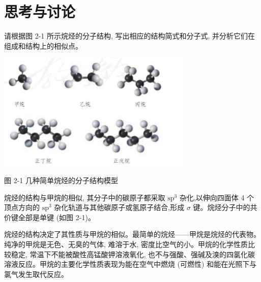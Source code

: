 \documentclass[10pt]{article}
\begin{document}
\section*{思考与讨论}

请根据图 2-1 所示烷烃的分子结构, 写出相应的结构简式和分子式, 并分析它们在组成和结构上的相似点。

\begin{center}
\end{center}

\begin{center}
\includegraphics[max width=0.7\textwidth]{images/0190efc5-b58a-7c43-bfb0-e0a030df9cfd_33_142214.jpg}
\end{center}

图 2-1 几种简单烷烃的分子结构模型

烷烃的结构与甲烷的相似, 其分子中的碳原子都采取 \({\mathrm{{sp}}}^{3}\) 杂化,以伸向四面体 4 个顶点方向的 \({\mathrm{{sp}}}^{3}\) 杂化轨道与其他碳原子或氢原子结合,形成 \(\sigma\) 键。烷烃分子中的共价键全部是单键 (如图 2-1)。

烷烃的结构决定了其性质与甲烷的相似。最简单的烷烃——甲烷是烷烃的代表物。纯净的甲烷是无色、无臭的气体, 难溶于水, 密度比空气的小。甲烷的化学性质比较稳定, 常温下不能被酸性高锰酸钾溶液氧化, 也不与强酸、强碱及溴的四氯化碳溶液反应。甲烷的主要化学性质表现为能在空气中燃烧 (可燃性) 和能在光照下与氯气发生取代反应。
\end{document}
